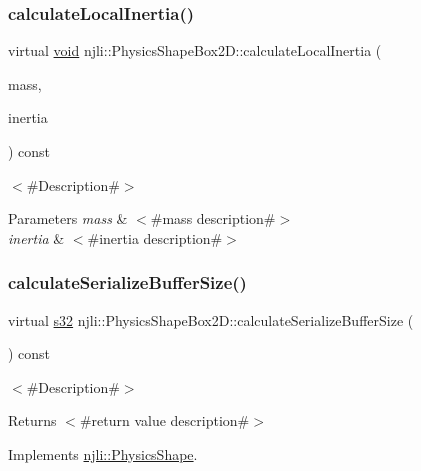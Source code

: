 \subsubsection{\texorpdfstring{calculate\+Local\+Inertia()}{calculateLocalInertia()}}
{\footnotesize\ttfamily virtual \mbox{\hyperlink{_thread_8h_af1e856da2e658414cb2456cb6f7ebc66}{void}} njli\+::\+Physics\+Shape\+Box2\+D\+::calculate\+Local\+Inertia (\begin{DoxyParamCaption}\item[{bt\+Scalar}]{mass,  }\item[{bt\+Vector3 \&}]{inertia }\end{DoxyParamCaption}) const\hspace{0.3cm}{\ttfamily [virtual]}}

$<$\#\+Description\#$>$


\begin{DoxyParams}{Parameters}
{\em mass} & $<$\#mass description\#$>$ \\
\hline
{\em inertia} & $<$\#inertia description\#$>$ \\
\hline
\end{DoxyParams}
\mbox{\label{classnjli_1_1_physics_shape_box2_d_a14716c113a5f559ffde6051a018bb7a2}} 
\subsubsection{\texorpdfstring{calculate\+Serialize\+Buffer\+Size()}{calculateSerializeBufferSize()}}
{\footnotesize\ttfamily virtual \mbox{\hyperlink{_util_8h_aa62c75d314a0d1f37f79c4b73b2292e2}{s32}} njli\+::\+Physics\+Shape\+Box2\+D\+::calculate\+Serialize\+Buffer\+Size (\begin{DoxyParamCaption}{ }\end{DoxyParamCaption}) const\hspace{0.3cm}{\ttfamily [virtual]}}

$<$\#\+Description\#$>$

\begin{DoxyReturn}{Returns}
$<$\#return value description\#$>$ 
\end{DoxyReturn}


Implements \mbox{\hyperlink{classnjli_1_1_physics_shape_a0612a1c8c3f4520d78cb7f5838f03074}{njli\+::\+Physics\+Shape}}.

